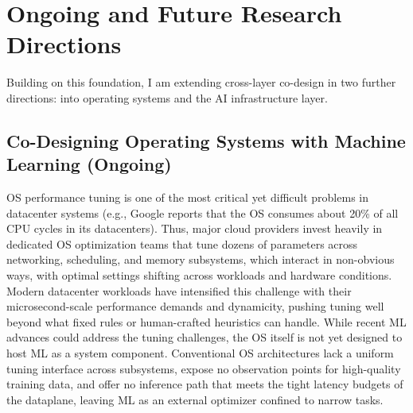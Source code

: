 \documentclass[11pt,letterpaper]{article}
\begin{document}
\section{Ongoing and Future Research Directions}

Building on this foundation, I am extending cross-layer co-design in two further directions: into operating systems and the AI infrastructure layer.

\subsection{Co-Designing Operating Systems with Machine Learning (Ongoing)}

OS performance tuning is one of the most critical yet difficult problems in datacenter systems (e.g., Google reports that the OS consumes about 20\% of all CPU cycles in its datacenters).
Thus, major cloud providers invest heavily in dedicated OS optimization teams that tune dozens of parameters across networking, scheduling, and memory subsystems, which interact in non-obvious ways, with optimal settings shifting across workloads and hardware conditions.
Modern datacenter workloads have intensified this challenge with their microsecond-scale performance demands and dynamicity, pushing tuning well beyond what fixed rules or human-crafted heuristics can handle.
While recent ML advances could address the tuning challenges, the OS itself is not yet designed to host ML as a system component.
Conventional OS architectures lack a uniform tuning interface across subsystems, expose no observation points for high-quality training data, and offer no inference path that meets the tight latency budgets of the dataplane, leaving ML as an external optimizer confined to narrow tasks.
\end{document}

